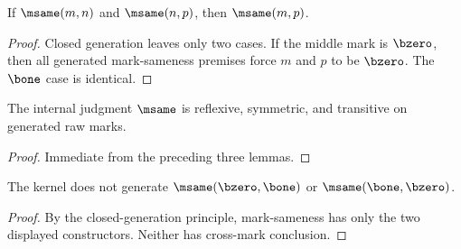 \begin{lemma}
If \(\msame(m,n)\) and \(\msame(n,p)\), then \(\msame(m,p)\).
\end{lemma}
\begin{proof}
Closed generation leaves only two cases. If the middle mark is \(\bzero\), then all generated mark-sameness premises force \(m\) and \(p\) to be \(\bzero\). The \(\bone\) case is identical.
\end{proof}

\begin{theorem}
\label{thm:mark-sameness-equivalence}
\label{thm:msame-internal-equivalence-spine}
The internal judgment \(\msame\) is reflexive, symmetric, and transitive on generated raw marks.
\end{theorem}
\begin{proof}
Immediate from the preceding three lemmas.
\end{proof}

\begin{theorem}
\label{thm:mark-no-confusion}
The kernel does not generate \(\msame(\bzero,\bone)\) or \(\msame(\bone,\bzero)\).
\end{theorem}
\begin{proof}
By the closed-generation principle, mark-sameness has only the two displayed constructors. Neither has cross-mark conclusion.
\end{proof}
